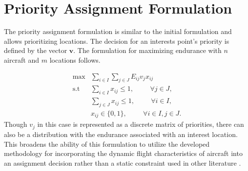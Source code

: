 \section{Priority Assignment Formulation}
The priority assignment formulation is similar to the initial formulation and allows prioritizing locations. The decision for an interests point's priority is defined by the vector $\mathbf{v}$. The formulation for maximizing endurance with $n$ aircraft and $m$ locations follows.\par
\begin{equation}
    \begin{aligned}
        \max &\sum_{i\in I}\sum_{j\in J} E_{ij}v_{j}x_{ij}\hspace{1cm}\\
        \text{s.t } &\sum_{i\in I}x_{ij} \leq 1,\hspace{1cm} \forall j\in J,\\
        &\sum_{j\in J}x_{ij} \leq 1,\hspace{1cm} \forall i \in I,\\
        &x_{ij}\in \{0,1\}, \hspace{1cm} \forall i\in I, j\in J.
    \end{aligned}
\end{equation}
Though $v_j$ in this case is represented as a discrete matrix of priorities, there can also be a distribution with the endurance associated with an interest location. This broadens the ability of this formulation to utilize the developed methodology for incorporating the dynamic flight characteristics of aircraft into an assignment decision rather than a static constraint used in other literature \cite{Alighanbari,Schumacher,Taylor}.
